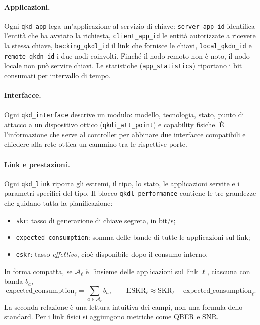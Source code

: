 \paragraph{Applicazioni.}
Ogni \texttt{qkd\_app} lega un'applicazione al servizio di chiave:
\texttt{server\_app\_id} identifica l'entità che ha avviato la richiesta,
\texttt{client\_app\_id} le entità autorizzate a ricevere la stessa chiave,
\texttt{backing\_qkdl\_id} il link che fornisce le chiavi,
\texttt{local\_qkdn\_id} e \texttt{remote\_qkdn\_id} i due nodi coinvolti.
Finché il nodo remoto non è noto, il nodo locale non può servire chiavi.
Le statistiche (\texttt{app\_statistics}) riportano i bit consumati per
intervallo di tempo.

\paragraph{Interfacce.}
Ogni \texttt{qkd\_interface} descrive un modulo: modello, tecnologia, stato,
punto di attacco a un dispositivo ottico (\texttt{qkdi\_att\_point}) e
capability fisiche. È l'informazione che serve al controller per abbinare
due interfacce compatibili e chiedere alla rete ottica un cammino tra le
rispettive porte.

\paragraph{Link e prestazioni.}
Ogni \texttt{qkd\_link} riporta gli estremi, il tipo, lo stato, le
applicazioni servite e i parametri specifici del tipo. Il blocco
\texttt{qkdl\_performance} contiene le tre grandezze che guidano tutta la
pianificazione:
\begin{itemize}
  \item \texttt{skr}: tasso di generazione di chiave segreta, in bit/s;
  \item \texttt{expected\_consumption}: somma delle bande di tutte le
        applicazioni sul link;
  \item \texttt{eskr}: tasso \emph{effettivo}, cioè disponibile dopo il
        consumo interno.
\end{itemize}
In forma compatta, se $\mathcal{A}_\ell$ è l'insieme delle applicazioni sul
link $\ell$, ciascuna con banda $b_a$,
\begin{equation}
  \text{expected\_consumption}_\ell = \sum_{a\in\mathcal{A}_\ell} b_a ,
  \qquad
  \mathrm{ESKR}_\ell \approx \mathrm{SKR}_\ell - \text{expected\_consumption}_\ell .
  \label{eq:eskr015}
\end{equation}
La seconda relazione è una lettura intuitiva dei campi, non una formula
dello standard. Per i link fisici si aggiungono metriche come QBER e SNR.

